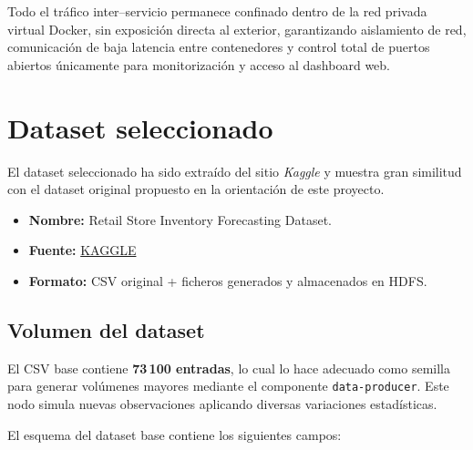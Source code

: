 \documentclass[12pt,a4paper]{article}
\begin{document}
	Todo el tráfico inter–servicio permanece confinado dentro de la red privada virtual Docker, sin exposición directa al exterior, garantizando aislamiento de red, comunicación de baja latencia entre contenedores y control total de puertos abiertos únicamente para monitorización y acceso al dashboard web.
	
	
	\section{Dataset seleccionado}
	El dataset seleccionado ha sido extraído del sitio \textit{Kaggle} y muestra gran similitud con el dataset original propuesto en la orientación de este proyecto.
	
	\begin{itemize}
		\item \textbf{Nombre:} Retail Store Inventory Forecasting Dataset.
		\item \textbf{Fuente:} \href{https://www.kaggle.com/datasets/anirudhchauhan/retail-store-inventory-forecasting-dataset}{KAGGLE}
		\item \textbf{Formato:} CSV original + ficheros generados y almacenados en HDFS.
	\end{itemize}
	

	\subsection{Volumen del dataset}
	El CSV base contiene \textbf{73\,100 entradas}, lo cual lo hace adecuado como semilla para generar volúmenes mayores mediante el componente \texttt{data-producer}. Este nodo simula nuevas observaciones aplicando diversas variaciones estadísticas.
	
	El esquema del dataset base contiene los siguientes campos:
	
\end{document}
